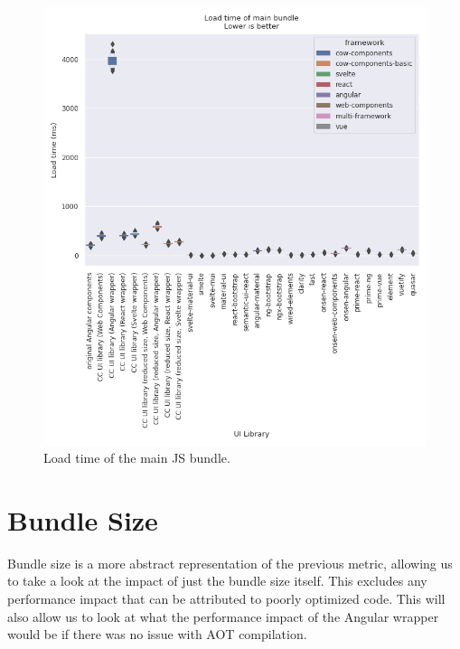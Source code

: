 \begin{figure}[h]
	\includegraphics[width=\columnwidth]{plots/load-time-all.png}
	\caption{Load time of the main JS bundle.}
	\label{fig:results:load-time-all}
	\centering
\end{figure}

\section{Bundle Size}
Bundle size is a more abstract representation of the previous metric, allowing us to take a look at the impact of just the bundle size itself. This excludes any performance impact that can be attributed to poorly optimized code. This will also allow us to look at what the performance impact of the Angular wrapper would be if there was no issue with AOT compilation.

